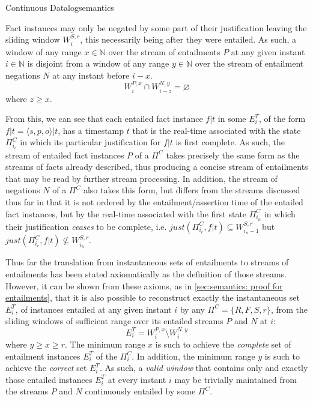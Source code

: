 \begin{nestedsection}{Continuous Datalog}{semantics}
\begin{axiom}
\label{axiom:continuous datalog: entailment precedes negation}
Fact instances may only be negated by some part of their justification leaving
the sliding window $W^{S,r}_{i}$, this necessarily being after they
were entailed.  As such, a window of any range ${x \in \mathbb{N}}$
over the stream of entailments $P$ at any given instant ${i \in \mathbb{N}}$
is disjoint from a window of any range ${y \in \mathbb{N}}$ over the
stream of entailment negations $N$ at any instant before ${i - x}$.
\begin{equation*}
W^{P,x}_{i} \cap W^{N,y}_{i-z} = \varnothing
\end{equation*}
where $z \geq x$.
\end{axiom}

From this, we can see that each entailed fact instance ${f|t}$ in some
$E^T_{i}$, of the form ${f|t = \langle s, p, o \rangle | t}$, has a timestamp $t$ that is
the real-time associated with the state $\Pi^C_{i_{e}}$ in which its particular justification for
${f|t}$ is first complete.
As such, the stream of entailed fact instances $P$ of a $\Pi^C$ takes precisely
the same form as the streams of facts already described, thus
producing a concise stream of entailments that may be read by
further stream processing.  In addition, the stream of negations $N$
of a $\Pi^C$ also takes this form, but differs from the streams
discussed thus far in that it is not ordered by the entailment/assertion time
of the entailed fact instances, but by the real-time associated with
the first state $\Pi^C_{i_{n}}$ in which their
justification \emph{ceases} to be complete,
i.e. ${just(\Pi^C_{i_{e}}, f|t) \subseteq W^{S,r}_{i_n - 1}}$ but
${just(\Pi^C_{i_{e}}, f|t) \not\subseteq W^{S,r}_{i_n}}$.

Thus far the translation from instantaneous sets of entailments to
streams of entailments has been stated axiomatically as the definition
of those streams.  However, it can be shown from these axioms, as in
\ref{sec:semantics: proof for entailments}, that it is also possible
to reconstruct exactly the instantaneous set $E^T_{i}$, of instances
entailed at any given instant $i$ by any $\Pi^C = \{ R, F, S, r \}$,
from the sliding windows of sufficient range over its entailed streams
$P$ and $N$ at $i$:
\[ E^T_{i} = W^{P,x}_{i} \setminus W^{N,y}_{i} \]
where ${y \geq x \geq r}$. The minimum range $x$ is such to achieve
the \emph{complete} set of entailment instances $E^T_{i}$ of the
$\Pi^C_{i}$. In addition, the minimum range $y$ is such to achieve the
\emph{correct} set $E^T_{i}$. As such, a \emph{valid window} that
contains only and exactly those entailed instances $E^T_{i}$ at every
instant $i$ may be trivially maintained from the streams $P$ and $N$
continuously entailed by some $\Pi^C$.
\end{nestedsection}

